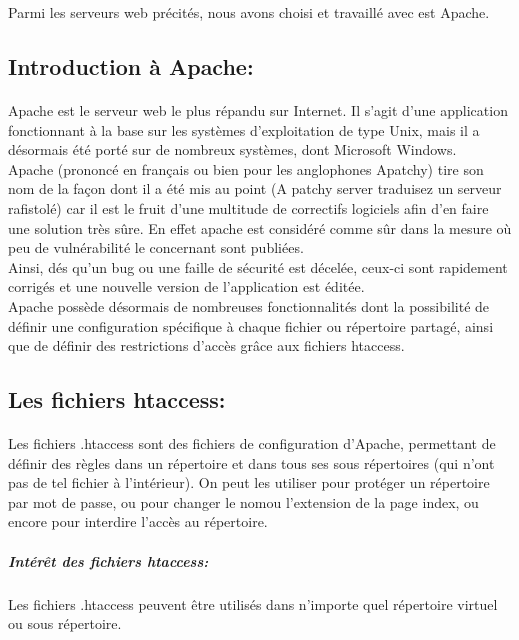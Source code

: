Parmi les serveurs web précités, nous avons choisi et travaillé avec
est Apache.

\subsection{Introduction à Apache:}
\paragraph{}
Apache est le serveur web le plus répandu sur Internet. Il s'agit d'une
application fonctionnant à la base sur les systèmes d'exploitation de type
Unix, mais il a désormais été porté sur de nombreux systèmes, dont Microsoft Windows.\\
Apache (prononcé en français ou bien pour les anglophones Apatchy) tire son nom de la façon dont il a été mis au point (A patchy server traduisez un serveur rafistolé) car il est le fruit d'une multitude de
correctifs logiciels afin d'en faire une solution très sûre. En effet apache est considéré comme sûr dans la mesure où peu de vulnérabilité le
concernant sont publiées.\\
Ainsi, dés qu'un bug ou une faille de sécurité est décelée, ceux-ci
sont rapidement corrigés et une nouvelle version de l'application est
éditée.\\

Apache possède désormais de nombreuses fonctionnalités dont la possibilité de définir une configuration spécifique à chaque fichier ou
répertoire partagé, ainsi que de définir des restrictions d'accès grâce aux fichiers htaccess.\\

\subsection{Les fichiers htaccess:}
\paragraph{}
Les fichiers .htaccess sont des fichiers de configuration d'Apache,
permettant de définir des règles dans un répertoire et dans tous ses sous
répertoires (qui n'ont pas de tel fichier à l'intérieur). On peut les utiliser pour protéger un répertoire par mot de passe, ou pour changer le nomou l'extension de la page index, ou encore pour interdire l'accès au
répertoire.\\
\subparagraph{Intérêt des fichiers htaccess:}

\paragraph{}
Les fichiers .htaccess peuvent être utilisés dans n'importe quel
répertoire virtuel ou sous répertoire.
